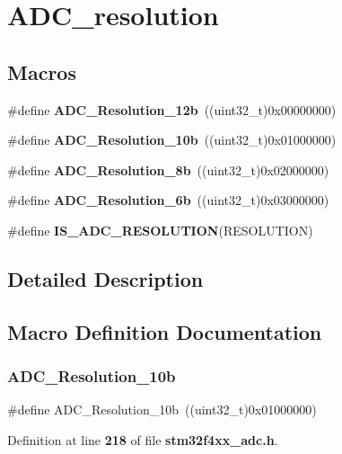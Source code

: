\section{A\+D\+C\+\_\+resolution}
\label{group__ADC__resolution}
\subsection*{Macros}
\begin{DoxyCompactItemize}
\item 
\#define \textbf{ A\+D\+C\+\_\+\+Resolution\+\_\+12b}~((uint32\+\_\+t)0x00000000)
\item 
\#define \textbf{ A\+D\+C\+\_\+\+Resolution\+\_\+10b}~((uint32\+\_\+t)0x01000000)
\item 
\#define \textbf{ A\+D\+C\+\_\+\+Resolution\+\_\+8b}~((uint32\+\_\+t)0x02000000)
\item 
\#define \textbf{ A\+D\+C\+\_\+\+Resolution\+\_\+6b}~((uint32\+\_\+t)0x03000000)
\item 
\#define \textbf{ I\+S\+\_\+\+A\+D\+C\+\_\+\+R\+E\+S\+O\+L\+U\+T\+I\+ON}(R\+E\+S\+O\+L\+U\+T\+I\+ON)
\end{DoxyCompactItemize}


\subsection{Detailed Description}


\subsection{Macro Definition Documentation}
\mbox{\label{group__ADC__resolution_ga783949335d175a2c32cdf46e1313ddac}} 
\subsubsection{A\+D\+C\+\_\+\+Resolution\+\_\+10b}
{\footnotesize\ttfamily \#define A\+D\+C\+\_\+\+Resolution\+\_\+10b~((uint32\+\_\+t)0x01000000)}



Definition at line \textbf{ 218} of file \textbf{ stm32f4xx\+\_\+adc.\+h}.

\mbox{\label{group__ADC__resolution_gac75d52ba1d748fa0b62da488490d98d0}} 
